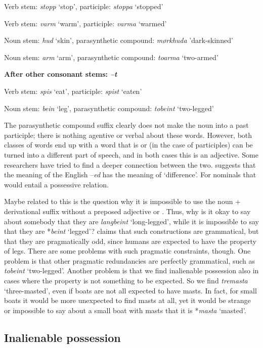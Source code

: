 \documentclass[output=paper]{LSP/langsci}
\begin{document}
Verb stem: \textit{stopp} ‘stop’, participle: \textit{stoppa} ‘stopped’

Verb stem: \textit{varm} ‘warm’, participle: \textit{varma} ‘warmed’

Noun stem: \textit{hud} ‘skin’, parasynthetic compound: \textit{mørkhuda} ’dark-skinned’

Noun stem: \textit{arm} ‘arm’, parasynthetic compound:  \textit{toarma} ‘two-armed’
\z

\ex \textbf{After other consonant stems:} \textit{\textbf{–t}} 

Verb stem: \textit{spis} ‘eat’, participle: \textit{spist} ‘eaten'

Noun stem: \textit{bein} ‘leg', parasynthetic compound:  \textit{tobeint} ‘two-legged’
\z
\z

The parasynthetic compound suffix clearly does not make the noun into a past participle; there is nothing agentive or verbal about these words. However, both classes of words end up with a word that is or (in the case of participles) can be turned into a different part of speech, and in both cases this is an adjective. Some researchers have tried to find a deeper  connection between the two. \citet{KoontzGarboden2012} suggests that the meaning of the English –\textit{ed} has the meaning of ‘difference’. For nominals that would entail a possessive relation. 

Maybe related to this is the question why it is impossible to use the noun + derivational suffix without a preposed adjective or . Thus, why is it okay to say about somebody that they are \textit{langbeint} ‘long-legged’, while it is impossible to say that they are *\textit{beint} ‘legged’? \citet[218--219]{Booij2005} claims that such constructions are grammatical, but that they are pragmatically odd, since humans are expected to have the property of legs. There are some problems with such pragmatic constraints, though. One problem is that other pragmatic redundancies are perfectly grammatical, such as \textit{tobeint} ‘two-legged’. Another problem is that we find inalienable possession also in cases where the property is not something to be expected. So we find \textit{tremasta} ‘three-masted’, even if boats are not all expected to have masts. In fact, for small boats it would be more unexpected to find masts at all, yet it would be strange or impossible to say about a small boat with masts that it is *\textit{masta} ‘masted’.  

\subsection{Inalienable possession} \label{sec:bondi:3.4}
\end{document}
